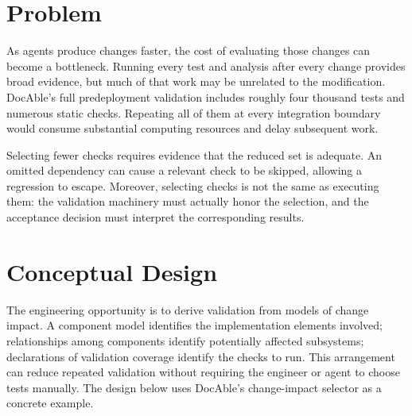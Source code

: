 
\section{Problem}\label{heading:problem}

As agents produce changes faster, the cost of evaluating those changes can become a bottleneck. Running every test and analysis after every change provides broad evidence, but much of that work may be unrelated to the modification. DocAble's full predeployment validation includes roughly four thousand tests and numerous static checks. Repeating all of them at every integration boundary would consume substantial computing resources and delay subsequent work.

Selecting fewer checks requires evidence that the reduced set is adequate. An omitted dependency can cause a relevant check to be skipped, allowing a regression to escape. Moreover, selecting checks is not the same as executing them: the validation machinery must actually honor the selection, and the acceptance decision must interpret the corresponding results.

\section{Conceptual Design}\label{heading:conceptual-design}

The engineering opportunity is to derive validation from models of change impact. A component model identifies the implementation elements involved; relationships among components identify potentially affected subsystems; declarations of validation coverage identify the checks to run. This arrangement can reduce repeated validation without requiring the engineer or agent to choose tests manually. The design below uses DocAble's change-impact selector as a concrete example.

